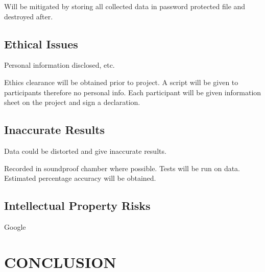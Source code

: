 \documentclass[10pt,twocolumn]{witseiepaper}
\begin{document}
Will be mitigated by storing all collected data in password protected file and destroyed after.

\subsection{Ethical Issues}
Personal information disclosed, etc.

Ethics clearance will be obtained prior to project. A script will be given to participants therefore no personal info. Each participant will be given information sheet on the project and sign a declaration.

\subsection{Inaccurate Results}
Data could be distorted and give inaccurate results.

Recorded in soundproof chamber where possible. Tests will be run on data. Estimated percentage accuracy will be obtained.

\subsection{Intellectual Property Risks}
Google
\section{CONCLUSION} %


%
%
%

\newpage
\onecolumn

\begin{appendix}

\end{appendix} 	

\end{document}

